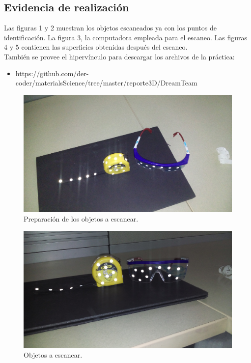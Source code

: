 
\subsection{Evidencia de realizaci\'on}
Las figuras 1 y 2 muestran los objetos escaneados ya con los puntos de identificaci\'on. La figura 3, la
computadora empleada para el escaneo. Las figuras 4 y 5 contienen las superficies obtenidas despu\'es del
escaneo.\\

Tambi\'en se provee el hiperv\'inculo para descargar los archivos de la pr\'actica:
\begin{itemize}
 \item https://github.com/der-coder/materialsScience/tree/master/reporte3D/DreamTeam
\end{itemize}


 \begin{figure}[!htbp]
 \centering
 \includegraphics [scale=0.1]
 {./img/20160502_180537.jpg}
  \caption{Preparaci\'on de los objetos a escanear.}
 \end{figure}

 \begin{figure}[!htbp]
 \centering
 \includegraphics [scale=0.1]
 {./img/20160502_180544.jpg}
  \caption{Objetos a escanear.}
 \end{figure}

